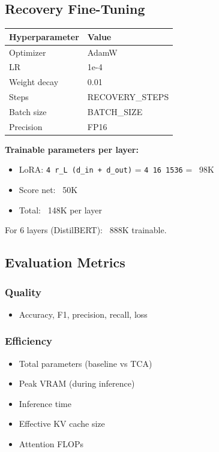 \subsection{Recovery Fine-Tuning}

\begin{table}[H]
\centering
\small
\begin{tabular}{ll}
\toprule
\textbf{Hyperparameter} & \textbf{Value} \\
\midrule
Optimizer & AdamW \\
LR & 1e-4 \\
Weight decay & 0.01 \\
Steps & {{RECOVERY\_STEPS}} \\
Batch size & {{BATCH\_SIZE}} \\
Precision & FP16 \\
\bottomrule
\end{tabular}
\end{table}

\textbf{Trainable parameters per layer:}
\begin{itemize}
\item LoRA: \texttt{4   r\_L (d\_in + d\_out)} = \texttt{4   16   1536} = ~98K
\item Score net: ~50K
\item Total: ~148K per layer

\end{itemize}
For 6 layers (DistilBERT): ~888K trainable.

\subsection{Evaluation Metrics}

\subsubsection{Quality}
\begin{itemize}
\item Accuracy, F1, precision, recall, loss

\end{itemize}
\subsubsection{Efficiency}
\begin{itemize}
\item Total parameters (baseline vs TCA)
\item Peak VRAM (during inference)
\item Inference time
\item Effective KV cache size
\item Attention FLOPs

\end{itemize}
